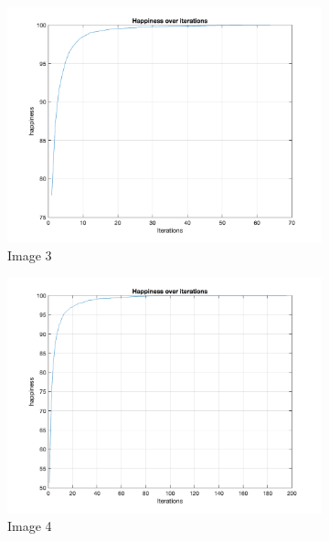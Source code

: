 \documentclass[unicode,11pt,a4paper,oneside,numbers=endperiod,openany]{scrartcl}
\begin{document}
\begin{figure}[H]
\begin{subfigure}[b]{0.4\textwidth}
        \includegraphics[width=\textwidth]{Convergence/ConvergenceH3Random_1.png}
        \caption{Image 3}
        \label{fig:image3}
      \end{subfigure}
      \begin{subfigure}[b]{0.4\textwidth}
        \includegraphics[width=\textwidth]{Convergence/ConvergenceH4Random_1.png}
        \caption{Image 4}
        \label{fig:image4}
      \end{subfigure}
      \begin{subfigure}[b]{0.4\textwidth}

\end{subfigure}
\end{figure}
\end{document}
